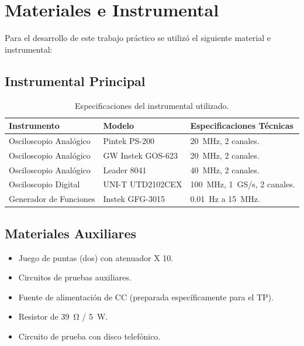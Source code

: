 \chapter{Materiales e Instrumental}

Para el desarrollo de este trabajo práctico se utilizó el siguiente material e instrumental:

\section{Instrumental Principal}

\begin{table}[H]
    \centering
    \begin{tabular}{|l|l|l|}
        \hline
        \textbf{Instrumento} & \textbf{Modelo} & \textbf{Especificaciones Técnicas} \\ \hline
        Osciloscopio Analógico & Pintek PS-200 & \qty{20}{MHz}, 2 canales. \\ \hline
        Osciloscopio Analógico & GW Instek GOS-623 & \qty{20}{MHz}, 2 canales. \\ \hline
        Osciloscopio Analógico & Leader 8041 & \qty{40}{MHz}, 2 canales. \\ \hline
        Osciloscopio Digital & UNI-T UTD2102CEX & \qty{100}{MHz}, \unit{1.GS/s}, 2 canales. \\ \hline
        Generador de Funciones & Instek GFG-3015 & \qty{0.01}{Hz} a \qty{15}{MHz}. \\ \hline
    \end{tabular}
    \caption{Especificaciones del instrumental utilizado.}
\end{table}

\section{Materiales Auxiliares}
\begin{itemize}
    \item Juego de puntas (dos) con atenuador X 10.
    \item Circuitos de pruebas auxiliares.
    \item Fuente de alimentación de CC (preparada específicamente para el TP).
    \item Resistor de \qty{39}{\ohm} / \qty{5}{W}.
    \item Circuito de prueba con disco telefónico.
\end{itemize}
